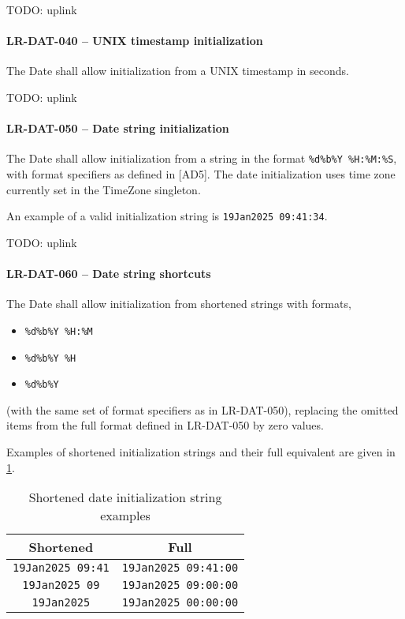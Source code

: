 TODO: uplink

\paragraph{LR-DAT-040 -- UNIX timestamp initialization}
The Date shall allow initialization from a UNIX timestamp in seconds.

TODO: uplink

\paragraph{LR-DAT-050 -- Date string initialization}
The Date shall allow initialization from a string in the format
\lstinline{%d%b%Y %H:%M:%S}, with format specifiers as defined in [AD5].
The date initialization uses time zone currently set
in the TimeZone singleton.

An example of a valid initialization string is \lstinline {19Jan2025 09:41:34}.

TODO: uplink

\paragraph{LR-DAT-060 -- Date string shortcuts}
The Date shall allow initialization from shortened strings
with formats,
\begin{itemize}
\item \lstinline{%d%b%Y %H:%M}
\item \lstinline{%d%b%Y %H}
\item \lstinline{%d%b%Y}
\end{itemize}
(with the same set of format specifiers as in LR-DAT-050),
replacing the omitted items from the full format defined in LR-DAT-050
by zero values.

Examples of shortened initialization strings and their full equivalent are
given in \cref{tab:date_shortened}.

\begin{table}
  \caption{\label{tab:date_shortened}
    Shortened date initialization string examples}
  \begin{tabular}{| c | c |} \hline
    \textbf{Shortened} & \textbf{Full} \\ \hline
    \texttt{19Jan2025 09:41} & \texttt{19Jan2025 09:41:00} \\ \hline
    \texttt{19Jan2025 09} & \texttt{19Jan2025 09:00:00} \\ \hline
    \texttt{19Jan2025} & \texttt{19Jan2025 00:00:00} \\ \hline
  \end{tabular}\end{table}

